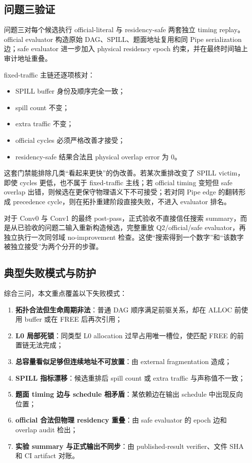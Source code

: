 \subsection{问题三验证}

问题三对每个候选执行 official-literal 与 residency-safe 两套独立 timing replay。official evaluator 构造原始 DAG、SPILL、题面地址复用和同 Pipe serialization 边；safe evaluator 进一步加入 physical residency epoch 约束，并在最终时间轴上审计地址重叠。

fixed-traffic 主链还逐项核对：
\begin{itemize}
    \item SPILL buffer 身份及顺序完全一致；
    \item spill count 不变；
    \item extra traffic 不变；
    \item official cycles 必须严格改善才接受；
    \item residency-safe 结果合法且 physical overlap error 为 0。
\end{itemize}

这套门禁能排除几类“看起来更快”的伪改善。若某次重排改变了 SPILL victim，即使 cycles 更低，也不属于 fixed-traffic 主线；若 official timing 变短但 safe overlap 出错，则候选在更保守物理语义下不可接受；若对同 Pipe edge 的翻转形成 precedence cycle，则在拓扑重建阶段直接失败，不进入 evaluator 排名。

对于 Conv0 与 Conv1 的最终 post-pass，正式验收不直接信任搜索 summary，而是从已验收的问题二输入重新构造候选，完整重放 Q2/official/safe evaluator，再独立执行一次同邻域 no-improvement 检查。这使“搜索得到一个数字”和“该数字被独立接受”为两个分开的步骤。

\subsection{典型失败模式与防护}

综合三问，本文重点覆盖以下失败模式：
\begin{enumerate}[label=(\arabic*)]
    \item \textbf{拓扑合法但生命周期非法}：普通 DAG 顺序满足前驱关系，却在 ALLOC 前使用 buffer 或在 FREE 后再次引用；
    \item \textbf{L0 局部死锁}：同类型 L0 allocation 过早占用唯一槽位，使匹配 FREE 的前置链无法完成；
    \item \textbf{总容量看似足够但连续地址不可放置}：由 external fragmentation 造成；
    \item \textbf{SPILL 指标漂移}：候选重排后 spill count 或 extra traffic 与声称值不一致；
    \item \textbf{题面 timing 边与 schedule 相矛盾}：某依赖边在输出 schedule 中出现反向位置；
    \item \textbf{official 合法但物理 residency 重叠}：由 safe evaluator 的 epoch 边和 overlap audit 检出；
    \item \textbf{实验 summary 与正式输出不同步}：由 published-result verifier、文件 SHA 和 CI artifact 对账。
\end{enumerate}

